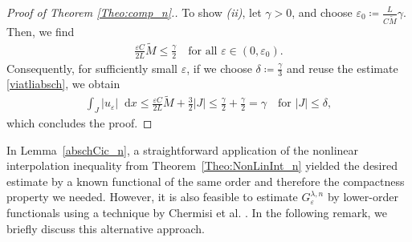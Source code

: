 \documentclass{article}
\newcommand{\dd}{\mathop{}\mathrm{d}} %
\newcommand{\lam}{\lambda}
\newcommand{\eps}{\varepsilon}
\newcommand{\enii}{\textit{(ii)}}
\numberwithin{figure}{section}
\numberwithin{equation}{section}
\begin{document}
\begin{proof}[Proof of Theorem \ref{Theo:comp_n}.]
    To show \enii, let $\gamma >0$, and choose $\eps_0 \coloneq \frac {L}{C\tilde{M}} \gamma$. Then, we find
    \begin{align}
        \frac {\eps C}{2L} \tilde{M} \leq \frac{\gamma}{2} \quad \text{for all } \eps \in (0,\eps_0).
    \end{align}
    Consequently, for sufficiently small $\eps$, if we choose $\delta \coloneq \frac \gamma3$ and reuse the estimate \eqref{viatliabsch}, we obtain
    \begin{align}
        \int_J |u_\eps|\dd x \leq \frac {\eps C}{2L} \tilde{M} + \frac 32 |J| \leq \frac \gamma2 + \frac \gamma2 = \gamma \quad \text{for } |J| \leq \delta,
    \end{align}
    which concludes the proof.
\end{proof}

In Lemma~\ref{abschCic_n}, a straightforward application of the nonlinear interpolation inequality from Theorem~\ref{Theo:NonLinInt_n} yielded the desired estimate by a known functional of the same order and therefore the compactness property we needed. However, it is also feasible to estimate $G^{\lam,n}_\eps$ by lower-order functionals using a technique by Chermisi et al. \cite[Section~4]{CheDalFonLeo}. In the following remark, we briefly discuss this alternative approach.
\end{document}
